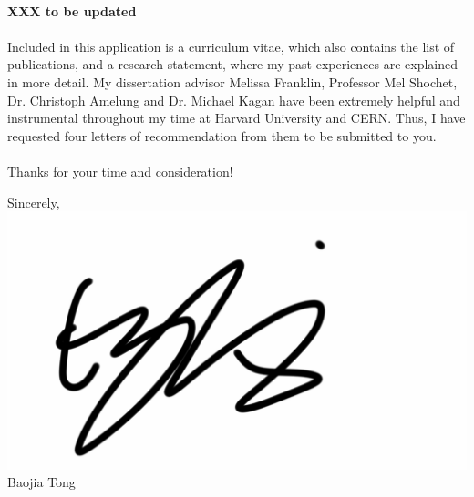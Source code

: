 \documentclass[letterpaper,11pt,oneside]{article}
\begin{document}
\paragraph{} 
\textbf{XXX to be updated }

\paragraph{}
Included in this application is a curriculum vitae, which also contains the list of publications, and a research statement, where my past experiences are explained in more detail. My dissertation advisor Melissa Franklin, Professor Mel Shochet, Dr. Christoph Amelung and Dr. Michael Kagan have been extremely helpful and instrumental throughout my time at Harvard University and CERN. Thus, I have requested four letters of recommendation from them to be submitted to you.

\paragraph{}
Thanks for your time and consideration!

\begin{flushright}
Sincerely, \\
\vspace{1em} 
\includegraphics[scale=0.1]{Signature} \\ %
\vspace{1em} 
Baojia Tong \\
\end{flushright}
\end{document}
